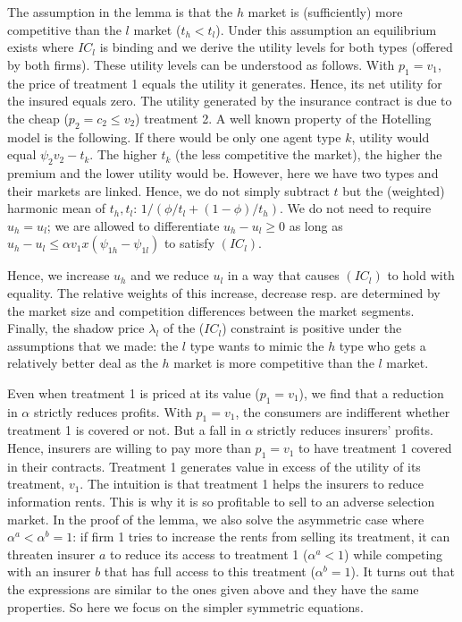 \documentclass[a4paper,12pt]{article}
\begin{document}
The assumption in the lemma is that the \(h\) market is (sufficiently) more competitive than the \(l\) market (\(t_h < t_l\)). Under this assumption an equilibrium exists where \(IC_l\) is binding and we derive the utility levels for both types (offered by both firms). These utility levels can be understood as follows. With \(p_1=v_1\), the price of treatment 1 equals the utility it generates. Hence, its net utility for the insured equals zero. The utility generated by the insurance contract is due to the cheap (\(p_2 = c_2 \le v_2\)) treatment 2. A well known property of the Hotelling model is the following.  If there would be only one agent type \(k\), utility would equal \(\psi_2 v_2 -t_k\). The higher \(t_k\) (the less competitive the market), the higher the premium and the lower utility would be. However, here we have two types and their markets are linked. Hence, we do not simply subtract \(t\) but the (weighted) harmonic mean of \(t_h,t_l\): \(1/(\phi/t_l+(1-\phi)/t_h)\). We do not need to require \(u_h=u_l\); we are allowed to differentiate \(u_h-u_l\geq 0\) as long as \(u_h-u_l \leq \alpha v_1 x(\psi_{1h}-\psi_{1l})\) to satisfy \((IC_l)\).

Hence, we increase \(u_h\) and we reduce \(u_l\) in a way that causes \((IC_l)\) to hold with equality. The relative weights of this increase, decrease resp. are determined by the market size and competition differences between the market segments. Finally, the shadow price \(\lambda_l\) of the (\(IC_l\)) constraint is positive under the assumptions that we made: the \(l\) type wants to mimic the \(h\) type who gets a relatively better deal as the \(h\) market is more competitive than the \(l\) market.

Even when treatment 1 is priced at its value (\(p_1=v_1\)), we find that a reduction in \(\alpha\) strictly reduces profits. With \(p_1=v_1\), the consumers are indifferent whether treatment 1 is covered or not. But a fall in \(\alpha\) strictly reduces insurers' profits. Hence, insurers are willing to pay more than \(p_1=v_1\) to have treatment 1 covered in their contracts. Treatment 1 generates value in excess of the utility of its treatment, \(v_1\). The intuition is that treatment 1 helps the insurers to reduce information rents. This is why it is so profitable to sell to an adverse selection market.
In the proof of the lemma, we also solve the asymmetric case where \(\alpha^a< \alpha^b =1\): if firm 1 tries to increase the rents from selling its treatment, it can threaten insurer \(a\) to reduce its access to treatment 1 (\(\alpha^a <1\)) while competing with an insurer \(b\) that has full access to this treatment (\(\alpha^b =1\)). It turns out that the expressions are similar to the ones given above and they have the same properties. So here we focus on the simpler symmetric equations.
\end{document}
